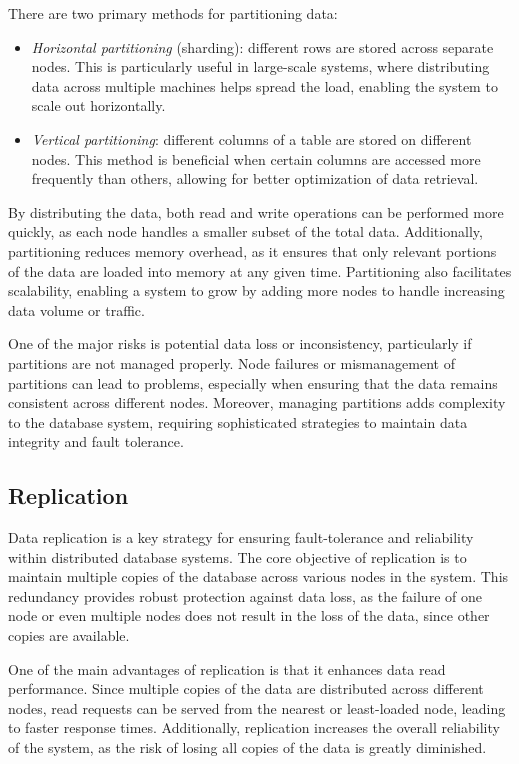 There are two primary methods for partitioning data:
\begin{itemize}
    \item \textit{Horizontal partitioning} (sharding): different rows are stored across separate nodes.
    This is particularly useful in large-scale systems, where distributing data across multiple machines helps spread the load, enabling the system to scale out horizontally.
    \item \textit{Vertical partitioning}: different columns of a table are stored on different nodes.
    This method is beneficial when certain columns are accessed more frequently than others, allowing for better optimization of data retrieval.
\end{itemize}
By distributing the data, both read and write operations can be performed more quickly, as each node handles a smaller subset of the total data.
Additionally, partitioning reduces memory overhead, as it ensures that only relevant portions of the data are loaded into memory at any given time. 
Partitioning also facilitates scalability, enabling a system to grow by adding more nodes to handle increasing data volume or traffic.

One of the major risks is potential data loss or inconsistency, particularly if partitions are not managed properly. 
Node failures or mismanagement of partitions can lead to problems, especially when ensuring that the data remains consistent across different nodes. 
Moreover, managing partitions adds complexity to the database system, requiring sophisticated strategies to maintain data integrity and fault tolerance.

\subsection{Replication}
Data replication is a key strategy for ensuring fault-tolerance and reliability within distributed database systems. 
The core objective of replication is to maintain multiple copies of the database across various nodes in the system.
This redundancy provides robust protection against data loss, as the failure of one node or even multiple nodes does not result in the loss of the data, since other copies are available.

One of the main advantages of replication is that it enhances data read performance. 
Since multiple copies of the data are distributed across different nodes, read requests can be served from the nearest or least-loaded node, leading to faster response times. 
Additionally, replication increases the overall reliability of the system, as the risk of losing all copies of the data is greatly diminished.

